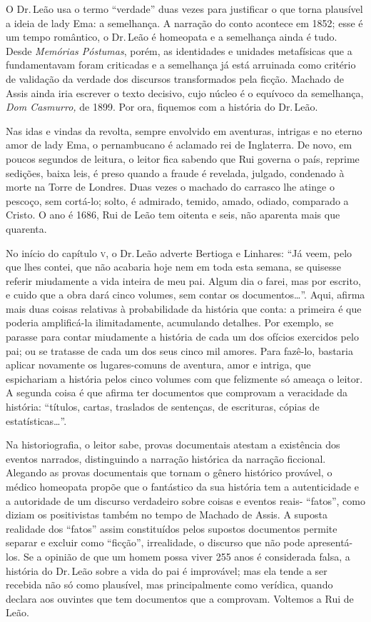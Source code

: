 O Dr.\,Leão usa o termo ``verdade'' duas vezes para justificar o que torna
plausível a ideia de lady Ema: a semelhança. A narração do conto
acontece em 1852; esse é um tempo romântico, o Dr.\,Leão é homeopata e a
semelhança ainda é tudo. Desde \emph{Memórias Póstumas}, porém, as
identidades e unidades metafísicas que a fundamentavam foram criticadas
e a semelhança já está arruinada como critério de validação da verdade
dos discursos transformados pela ficção. Machado de Assis ainda iria
escrever o texto decisivo, cujo núcleo é o equívoco da semelhança,
\emph{Dom Casmurro,} de 1899. Por ora, fiquemos com a história do Dr.\,Leão.

Nas idas e vindas da revolta, sempre envolvido em aventuras, intrigas e
no eterno amor de lady Ema, o pernambucano é aclamado rei de Inglaterra.
De novo, em poucos segundos de leitura, o leitor fica sabendo que Rui
governa o país, reprime sedições, baixa leis, é preso quando a fraude é
revelada, julgado, condenado à morte na Torre de Londres. Duas vezes o
machado do carrasco lhe atinge o pescoço, sem cortá-lo; solto, é
admirado, temido, amado, odiado, comparado a Cristo. O ano é 1686, Rui
de Leão tem oitenta e seis, não aparenta mais que quarenta.

No início do capítulo \textsc{v}, o Dr.\,Leão adverte Bertioga e Linhares: ``Já
veem, pelo que lhes contei, que não acabaria hoje nem em toda esta
semana, se quisesse referir miudamente a vida inteira de meu pai. Algum
dia o farei, mas por escrito, e cuido que a obra dará cinco volumes, sem
contar os documentos\ldots{}''. Aqui, afirma mais duas coisas relativas à
probabilidade da história que conta: a primeira é que poderia
amplificá-la ilimitadamente, acumulando detalhes. Por exemplo, se
parasse para contar miudamente a história de cada um dos ofícios
exercidos pelo pai; ou se tratasse de cada um dos seus cinco mil amores.
Para fazê-lo, bastaria aplicar novamente os lugares-comuns de aventura,
amor e intriga, que espichariam a história pelos cinco volumes com que
felizmente só ameaça o leitor. A segunda coisa é que afirma ter
documentos que comprovam a veracidade da história: ``títulos, cartas,
traslados de sentenças, de escrituras, cópias de estatísticas\ldots{}''.

Na historiografia, o leitor sabe, provas documentais atestam a
existência dos eventos narrados, distinguindo a narração histórica da
narração ficcional. Alegando as provas documentais que tornam o gênero
histórico provável, o médico homeopata propõe que o fantástico da sua
história tem a autenticidade e a autoridade de um discurso verdadeiro
sobre coisas e eventos reais- ``fatos'', como diziam os positivistas
também no tempo de Machado de Assis. A suposta realidade dos ``fatos''
assim constituídos pelos supostos documentos permite separar e excluir
como ``ficção'', irrealidade, o discurso que não pode apresentá-los. Se a
opinião de que um homem possa viver 255 anos é considerada falsa, a
história do Dr.\,Leão sobre a vida do pai é improvável; mas ela tende a
ser recebida não só como plausível, mas principalmente como verídica,
quando declara aos ouvintes que tem documentos que a comprovam. Voltemos
a Rui de Leão.

